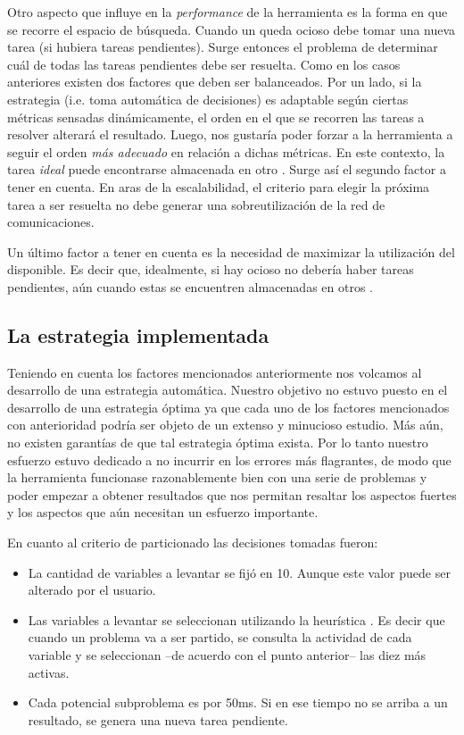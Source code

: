Otro aspecto que influye en la \emph{performance} de la herramienta es la
forma en que se recorre el espacio de búsqueda. Cuando un \w queda ocioso debe
tomar una nueva tarea (si hubiera tareas pendientes). Surge entonces el
problema de determinar cuál de todas las tareas pendientes debe ser resuelta.
Como en los casos anteriores existen dos factores que deben ser balanceados.
Por un lado, si la estrategia (i.e. toma automática de decisiones) es adaptable según ciertas métricas sensadas dinámicamente, el
orden en el que se recorren las tareas a resolver alterará el resultado. Luego, nos gustaría poder
forzar a la herramienta a seguir el orden \emph{más adecuado} en relación a dichas métricas. En este contexto, la tarea \emph{ideal} puede encontrarse
almacenada en otro \w. Surge así el segundo factor a tener en cuenta. En aras
de la escalabilidad, el criterio para elegir la próxima tarea a ser resuelta no
debe generar una sobreutilización de la red de comunicaciones.

Un último factor a tener en cuenta es la necesidad de maximizar la utilización
del \hard disponible. Es decir que, idealmente, si hay \hard ocioso no debería
haber tareas pendientes, aún cuando estas se encuentren almacenadas en otros \w.

\subsection{La estrategia implementada}

Teniendo en cuenta los factores mencionados anteriormente nos volcamos al
desarrollo de una estrategia automática. Nuestro objetivo no estuvo puesto en
el desarrollo de una estrategia óptima ya que cada uno de los factores
mencionados con anterioridad podría ser objeto de un extenso y minucioso estudio. 
Más aún, no existen garantías de que tal estrategia óptima exista. Por lo tanto nuestro esfuerzo estuvo dedicado a no
incurrir en los errores más flagrantes, de modo que la herramienta funcionase
razonablemente bien con una serie de problemas y poder empezar a obtener
resultados que nos permitan resaltar los aspectos fuertes y los aspectos que
aún necesitan un esfuerzo importante.

En cuanto al criterio de particionado las decisiones tomadas fueron:

\begin{itemize}
	\item La cantidad de variables a levantar se fijó en 10. Aunque este valor puede ser alterado por el usuario.
	\item Las variables a levantar se seleccionan utilizando la heurística \vsids. Es decir que cuando un problema va a ser partido, se consulta la actividad de cada variable y se seleccionan --de acuerdo con el punto anterior-- las diez más activas.
	\item Cada potencial subproblema es \solveado por 50ms. Si en ese tiempo no se arriba a un resultado, se genera una nueva tarea pendiente.
\end{itemize}

